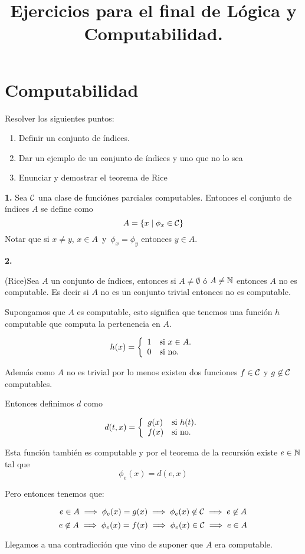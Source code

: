 \documentclass[leqno, 12pt, twoside,letterpaper]{book}
\title{Ejercicios para el final de Lógica y Computabilidad.}
\begin{document}
\maketitle
\section*{Computabilidad}

\begin{ej}{13}
    Resolver los siguientes puntos:
    \begin{enumerate}
        \item Definir un conjunto de índices.
        \item Dar un ejemplo de un conjunto de índices y uno que no lo sea
        \item Enunciar y demostrar el teorema de Rice
    \end{enumerate}
\end{ej}

\begin{solucion}
\textbf{1.} Sea $\mathcal{C}$ una clase de funciónes parciales computables. Entonces el conjunto de índices $A$ se define como
\[
	A = \{ x \mid \phi_{x} \in \mathcal{C} \}
\]
Notar que si $x \neq y$, $x \in A\,$ y $\,\phi_{x} = \phi_{y}$ entonces $y \in A$.

\noindent\textbf{2.}

\begin{teo}{ (Rice)}Sea $A$ un conjunto de índices, entonces si $A \neq \emptyset$ ó $A \neq \mathbb{N}$ entonces $A$ no es computable. Es decir si $A$ no es un conjunto trivial entonces no es computable.
\end{teo}

\begin{dem}
	Supongamos que $A$ es computable, esto significa que tenemos una función $h$ computable que computa la pertenencia en $A$.

	\[
	h(x) = \left\{ \begin{array}{ll} 1 & \mbox{si } x \in A. \\ 0 & \mbox{} \mbox{si no.} \end{array} \right.
	\]

	\noindent Además como $A$ no es trivial por lo menos existen dos funciones $f \in \mathcal{C}$ y $g \not\in \mathcal{C}$ computables.

	\noindent Entonces definimos $d$ como

	\[
		d(t, x) = \left\{ \begin{array}{ll} g(x) & \mbox{si } h(t). \\ f(x) & \mbox{} \mbox{si no.} \end{array} \right.
	\]

	\noindent Esta función también es computable y por el teorema de la recursión existe $e \in \mathbb{N}$ tal que
	\[
	\phi_{e}(x) = d(e, x)
	\]

	\noindent Pero entonces tenemos que:

	\[ e \in A \implies \phi_{e}(x) = g(x) \implies \phi_{e}(x) \not\in \mathcal{C} \implies e \not\in A\]
	\[ e \not\in A \implies \phi_{e}(x) = f(x) \implies \phi_{e}(x) \in \mathcal{C} \implies e \in A\]

	\noindent Llegamos a una contradicción que vino de suponer que $A$ era computable.

\end{dem}
\end{solucion}
\end{document}

